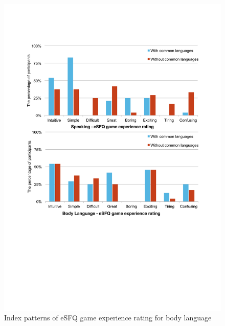 \begin{figure}[!h]
\centering
\includegraphics[width=1.0\columnwidth]{Figures/US_Consistent_Bodylanguage.pdf}
\caption{Index patterns of eSFQ game experience rating for body language}
\label{fig:US_Consistent_Bodylanguage}
\end{figure}


